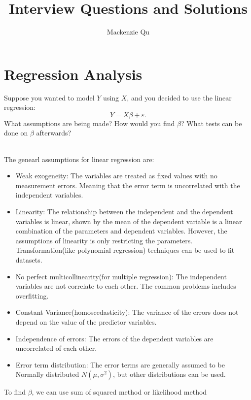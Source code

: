 \documentclass[answers]{exam}
\begin{document}
\title{Interview Questions and Solutions}
\author{Mackenzie Qu}
\maketitle
\thispagestyle{empty}
\section{Regression Analysis}
\begin{questions}
\question Suppose you wanted to model $Y$ using $X$, and you decided to use the linear regression:
\[
  Y = X \beta + \varepsilon
  \text{.}
\]
What assumptions are being made?
How would you find $\beta$?
What tests can be done on $\beta$ afterwards?

\begin{solution}[.2in]
    \\
    The genearl assumptions for linear regression are:
    \begin{itemize}
        \item Weak exogeneity: The variables are treated as fixed values with no 
        measurement errors. Meaning that the error term is uncorrelated with the independent variables.
        \item Linearity: The relationship between the independent and the dependent
     variables is linear, shown by the mean of the dependent variable is a linear combination
     of the parameters and dependent variables. However, the assumptions of linearity is only restricting the parameters.
     Transformation(like polynomial regression) techniques can be used to fit datasets.
        \item No perfect multicollinearity(for multiple regression): The independent variables are not correlate to each other. The common problems includes overfitting.
        \item Constant Variance(homoscedasticity): The variance of the errors does not depend on the value of
        the predictor variables.
        \item Independence of errors: The errors of the dependent variables are uncorrelated of each other.
        \item Error term distribution: The error terms are generally assumed to be Normally distributed $N(\mu, \sigma^2)$, but other distributions can be used. 
    \end{itemize}
    To find $\beta$, we can use sum of squared method or likelihood method


\end{solution}
\end{questions}
\end{document}
